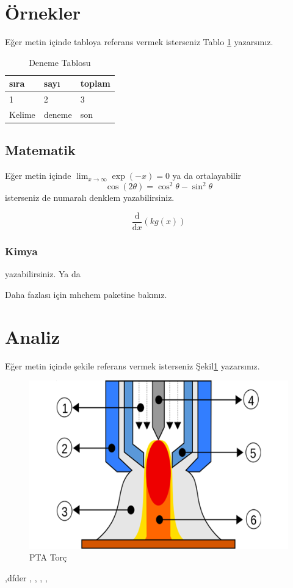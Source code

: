 \lipsum[1-2]
\section{Örnekler}
Eğer metin içinde tabloya referans vermek isterseniz Tablo \ref{tab:den} yazarsınız. 
\begin{table}[h]
\centering
\caption{Deneme Tablosu} \label{tab:den}
\begin{tabular}{|l|l|l|}
\hline
sıra   & sayı   & toplam \\ \hline
1      & 2      & 3      \\ \hline
Kelime & deneme & son    \\ \hline
\end{tabular}
\end{table}

\subsection{Matematik}
Eğer metin içinde \(\lim_{x \to \infty} \exp(-x) = 0\) ya da ortalayabilir
\begin{displaymath}
\cos (2\theta) = \cos^2 \theta - \sin^2 \theta
\end{displaymath}
isterseniz de numaralı denklem yazabilirsiniz.

\begin{equation}
\frac{\mathrm d}{\mathrm d x} \left( k g(x) \right)
\end{equation}
\subsubsection{Kimya}
 yazabilirsiniz. Ya da


Daha fazlası için mhchem paketine bakınız.
 
\section{Analiz}
Eğer metin içinde şekile referans vermek isterseniz Şekil\ref{fig:PtaTorc} yazarsınız. 
\begin{figure}[h]
\caption{PTA Torç}\label{fig:PtaTorc}
\includegraphics[width=\textwidth]{gorseller/ptaTorc}
\end{figure}
\lipsum[1-2]
\parencite{celik_microstructure_2013} \parencite{gatto_plasma_2004}
\cite{celik_effects_2011}

\cite{yazdi_microstructure_2015},dfder \cite{keehan_influence_2006}, \cite{guo_microstructure_2014}, \cite{kim_variation_2013}, \cite{xibao_metallurgical_2005-1}, \cite{jin_effect_1997}